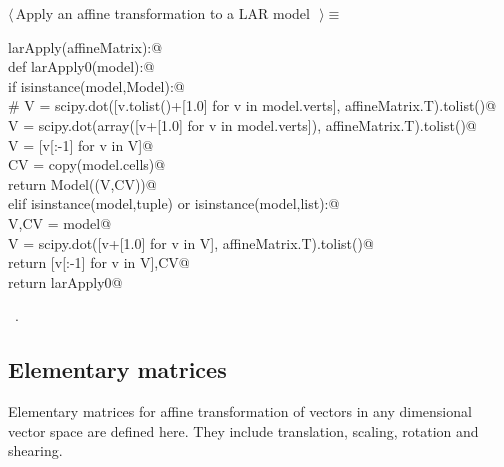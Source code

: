 \documentclass[11pt,oneside]{article}	%
\begin{document}
\begin{flushleft} \small \label{scrap23}
$\langle\,$Apply an affine transformation to a LAR model\nobreak\ {\footnotesize {}}$\,\rangle\equiv$
\vspace{-1ex}
\begin{list}{}{} \item
\mbox{}\verb@def larApply(affineMatrix):@\\
\mbox{}\verb@   def larApply0(model):@\\
\mbox{}\verb@      if isinstance(model,Model):@\\
\mbox{}\verb@         # V = scipy.dot([v.tolist()+[1.0] for v in model.verts], affineMatrix.T).tolist()@\\
\mbox{}\verb@         V = scipy.dot(array([v+[1.0] for v in model.verts]), affineMatrix.T).tolist()@\\
\mbox{}\verb@         V = [v[:-1] for v in V]@\\
\mbox{}\verb@         CV = copy(model.cells)@\\
\mbox{}\verb@         return Model((V,CV))@\\
\mbox{}\verb@      elif isinstance(model,tuple) or isinstance(model,list):@\\
\mbox{}\verb@         V,CV = model@\\
\mbox{}\verb@         V = scipy.dot([v+[1.0] for v in V], affineMatrix.T).tolist()@\\
\mbox{}\verb@         return [v[:-1] for v in V],CV@\\
\mbox{}\verb@   return larApply0@\\
\mbox{}\verb@@{\NWsep}
\end{list}
\vspace{-1ex}
\footnotesize\addtolength{\baselineskip}{-1ex}
\begin{list}{}{\setlength{\itemsep}{-\parsep}\setlength{\itemindent}{-\leftmargin}}
\item \NWtxtMacroRefIn\ .
\end{list}
\end{flushleft}


\subsection{Elementary matrices}
Elementary matrices for affine transformation of vectors in any dimensional vector space are defined here. They include translation, scaling, rotation and shearing. 
\end{document}
